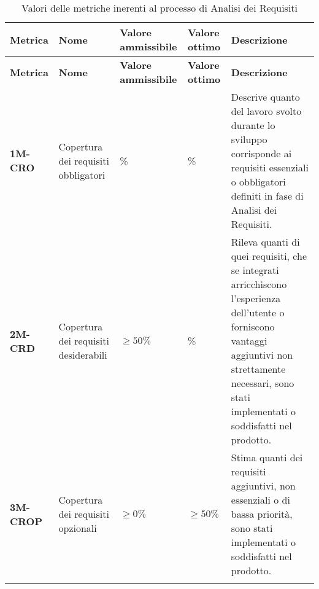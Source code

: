 \begin{longtable}{|>{\centering\arraybackslash}p{}|>{\centering\arraybackslash}p{}|>{\centering\arraybackslash}p{}|>{\centering\arraybackslash}p{}|>{\centering\arraybackslash}p{}|}
	\hline
	\textbf{Metrica} & \textbf{Nome}                        & \textbf{Valore ammissibile} & \textbf{Valore ottimo} & \textbf{Descrizione}                                                                                                                                                                                      \\
	\hline
	\endfirsthead
	\hline
	\textbf{Metrica} & \textbf{Nome}                        & \textbf{Valore ammissibile} & \textbf{Valore ottimo} & \textbf{Descrizione}                                                                                                                                                                                      \\
	\endhead
	\textbf{1M-CRO}  & Copertura dei requisiti obbligatori  & 100\%                       & 100\%                  & Descrive quanto del lavoro svolto durante lo sviluppo corrisponde ai requisiti essenziali o obbligatori definiti in fase di Analisi dei Requisiti.                                                        \\
	\hline
	\textbf{2M-CRD}  & Copertura dei requisiti desiderabili & $\geq 50\% $                & 100\%                  & Rileva quanti di quei requisiti, che se integrati arricchiscono l'esperienza dell'utente o forniscono vantaggi aggiuntivi non strettamente necessari, sono stati implementati o soddisfatti nel prodotto. \\
	\hline
	\textbf{3M-CROP} & Copertura dei requisiti opzionali    & $\geq 0\% $                 & $\geq 50\% $           & Stima quanti dei requisiti aggiuntivi, non essenziali o di bassa priorità, sono stati implementati o soddisfatti nel prodotto.                                                                            \\
	\hline
	\caption{ Valori delle metriche inerenti al processo di Analisi dei Requisiti}
	\label{table:1}
\end{longtable}

